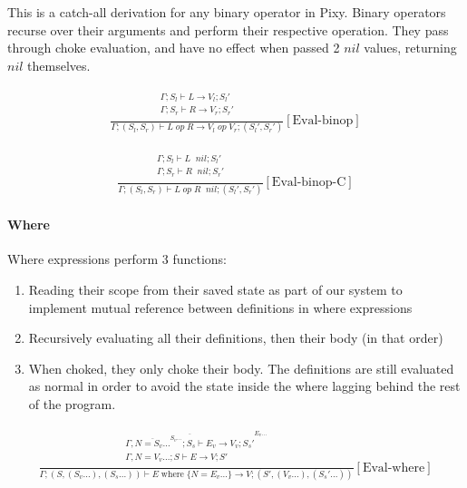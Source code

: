 \documentclass{scrartcl}
\DeclareMathOperator{\where}{where}
\DeclareMathOperator{\ceval}{\overset{C}{\rightarrow}}
\begin{document}
    This is a catch-all derivation for any binary operator in Pixy. Binary operators recurse over their arguments and perform their respective operation. They pass through choke evaluation, and have no effect when passed 2 $nil$ values, returning $nil$ themselves.
    
    \begin{align*}
    \frac{
        \begin{matrix}
        \Gamma; S_l \vdash L \rightarrow V_l; S_l' \\
        \Gamma; S_r \vdash R \rightarrow V_r; S_r' \\
        \end{matrix}
    }{
        \Gamma; (S_l, S_r) \vdash L \; op \; R \rightarrow V_l \; op \; V_r; (S_l', S_r')
    }[\text{Eval-binop}]
    \end{align*}
    
    \begin{align*}
    \frac{
        \begin{matrix}
        \Gamma; S_l \vdash L \ceval nil; S_l' \\
        \Gamma; S_r \vdash R \ceval nil; S_r' \\
        \end{matrix}
    }{
        \Gamma; (S_l, S_r) \vdash L \; op \; R \ceval nil; (S_l', S_r')
    }[\text{Eval-binop-C}]
    \end{align*}
    
    \paragraph{Where}
    
    Where expressions perform 3 functions:
    
    \begin{enumerate}
        \item Reading their scope from their saved state as part of our system to implement mutual reference between definitions in where expressions
        \item Recursively evaluating all their definitions, then their body (in that order)
        \item When choked, they only choke their body. The definitions are still evaluated as normal in order to avoid the state inside the where lagging behind the rest of the program.
    \end{enumerate}
    
    \begin{align*}
    \frac{
        \begin{matrix}
        \overline{\Gamma, \overline{N=S_v...}^{S_v...}; S_s \vdash E_v \rightarrow V_v; S_s'}^{E_v...} \\
        \Gamma, N=V_v...; S \vdash E \rightarrow V; S' \\
        \end{matrix}
    }{
        \Gamma; (S, (S_v...), (S_s...)) \vdash E \where \{ N=E_v... \} \rightarrow V; (S', (V_v...), (S_s'...))
    }[\text{Eval-where}]
    \end{align*}
    
\end{document}
